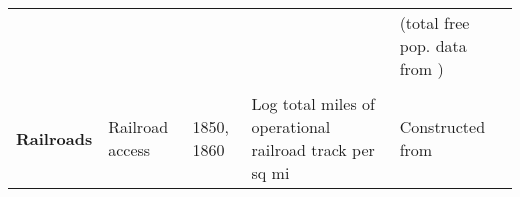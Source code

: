 \begin{tabular}{@{}l|llll@{}}
                        		           &                                                             &                                    &             &            (total free pop. data from \citet{haines2010})                                                                                         \\      
                                   &                                                             &                                    &             &                                                                                                                                                                                                   \\       
\textbf{Railroads} 	 & Railroad  access                                           & 1850, 1860                         &  Log total miles of operational railroad track per sq mi     &  Constructed from \cite{atack2013use}      \\
  \hline\hline                                                                                                                               
\end{tabular}